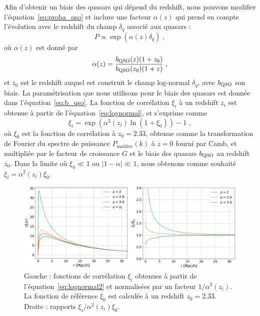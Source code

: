 Afin d'obtenir un biais des quasars qui dépend du redshift, nous pouvons modifier l'équation~\ref{eq:proba_qso} et inclure une facteur $\alpha(z)$ qui prend en compte l'évolution avec le redshift du champ $\delta_q$ associé aux quasars :
\begin{equation}
  \label{eq:proba_qso2}
  P \propto \exp(\alpha(z)\delta_q) \; ,
\end{equation}
où $\alpha(z)$ est donné par
\begin{equation}
  \alpha(z) = \frac{b_{\textsc{QSO}}(z) (1+z_0)}{b_{\textsc{QSO}}(z_0)(1+z)} \; ,
\end{equation}
et $z_0$ est le redshift auquel est construit le champ log-normal $\delta_q$, avec $b_{\textsc{QSO}}$ son biais.
  La paramétrisation que nous utilisons pour le biais des quasars est donnée dans l'équation~\ref{eq:b_qso}.
  La fonction de corrélation $\xi_i$ à un redshift $z_i$ est obtenue à partir de l'équation~\ref{eq:lognormal}, et s'exprime comme
  \begin{equation}
    \label{eq:lognormal2}
    \xi_i = \exp(\alpha^2(z_i) \ln (1 + \xi_0)) - 1 \; ,
  \end{equation}
  où $\xi_0$ est la fonction de corrélation à $z_0 = \num{2.33}$, obtenue comme la transformation de Fourier du spectre de puissance $P_{\mathrm{matière}}(k)$ à $z=0$ fourni par Camb, et multipliée par le facteur de croissance $G$ et le biais des quasars $b_{\textsc{QSO}}$ au redshift $z_0$.
  Dans la limite où $\xi_0 \ll 1$ ou $|1 - \alpha | \ll 1$, nous obtenons comme souhaité $\xi_i = \alpha^2(z_i) \xi_0$.
\begin{figure}
  \centering
  \includegraphics[scale=0.4]{qsolognormal1}
  \caption{Gauche : fonctions de corrélation $\xi_i$ obtenues à partir de l'équation~\ref{eq:lognormal2} et normalisées par un facteur $1 / \alpha^2(z_i)$. La fonction de référence $\xi_0$ est calculée à un redshift $z_0 = \num{2.33}$. Droite : rapports $\xi_i / \alpha^2(z_i) \xi_0$.}
  \label{fig:qsolognormal1}
\end{figure}
